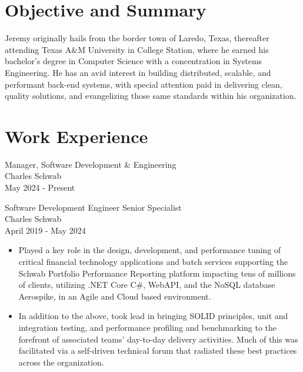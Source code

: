 \documentclass[11pt]{res} %
\begin{document}
 
 

\address{{\bf Current Address} \\   2912 Sebring Circle \\   Austin, TX
         78747  \\ (956)286-8386}
\address{{\bf Contact Information} \\ jeremycantu.com \\ github.com/jac21 \\ mail@jeremycantu.com}
 
                                             
\begin{resume}
                                               
 
\section{Objective and Summary}
   Jeremy originally hails from the border town of Laredo, Texas, thereafter attending Texas A\&M University in College Station, where he earned his bachelor's degree in Computer Science with a concentration in Systems Engineering. He has an avid interest in building distributed, scalable, and performant back-end systems, with special attention paid in delivering clean, quality solutions, and evangelizing those same standards within his organization.
 
\section{Work Experience}

Manager, Software Development \& Engineering \\
Charles Schwab \\
May 2024 - Present

Software Development Engineer Senior Specialist \\
Charles Schwab \\
April 2019 - May 2024
\vspace{0.2in}
   \begin{itemize} \itemsep -2pt  %
   \item Played a key role in the design, development, and performance tuning of critical financial technology applications and batch services supporting the Schwab Portfolio Performance Reporting platform impacting tens of millions of clients, utilizing .NET Core C\#, WebAPI, and the NoSQL database Aerospike, in an Agile and Cloud based environment. 
\newline
    \item In addition to the above, took lead in bringing SOLID principles, unit and integration testing, and performance profiling and benchmarking to the forefront of associated teams' day-to-day delivery activities. Much of this was facilitated via a self-driven technical forum that radiated these best practices across the organization.
 \end{itemize}


\end{resume}
\end{document}
